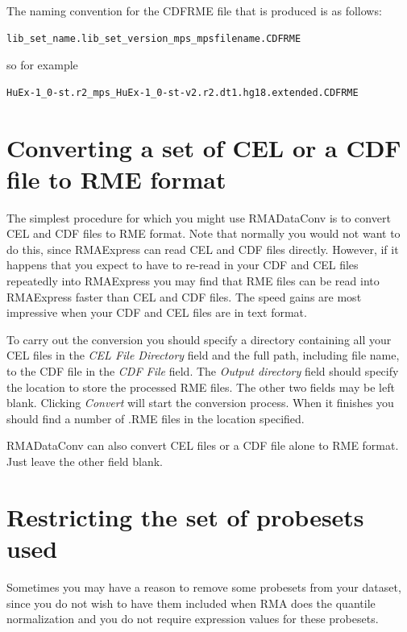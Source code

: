 \documentclass[11pt]{report}
\begin{document}
The naming convention for the CDFRME file that is produced is as follows:
\begin{verbatim}
lib_set_name.lib_set_version_mps_mpsfilename.CDFRME
\end{verbatim}
so for example
\begin{verbatim}
HuEx-1_0-st.r2_mps_HuEx-1_0-st-v2.r2.dt1.hg18.extended.CDFRME
\end{verbatim}

\section{Converting a set of CEL or a CDF file to RME format}

The simplest procedure for which you might use RMADataConv is to convert CEL and CDF files to RME format. Note that normally you would not want to do this, since RMAExpress can read CEL and CDF files directly. However, if it happens that you expect to have to re-read in your CDF and CEL files repeatedly into RMAExpress you may find that RME files can be read into RMAExpress faster than CEL and CDF files. The speed gains are most impressive when your CDF and CEL files are in text format.

To carry out the conversion you should specify a directory containing all your CEL files in the {\it CEL File Directory} field and the full path, including file name, to the CDF file in the {\it CDF File} field. The {\it Output directory} field should specify the location to store the processed RME files. The other two fields may be left blank. Clicking {\it Convert} will start the conversion process. When it finishes you should find a number of .RME files in the location specified. 

RMADataConv can also convert CEL files or a CDF file alone to RME format. Just leave the other field blank.

\section{Restricting the set of probesets used}

Sometimes you may have a reason to remove some probesets from your dataset, since you do not wish to have them included when RMA does the quantile normalization and you do not require expression values for these probesets. 
\end{document}
